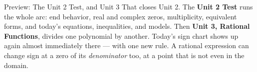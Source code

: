 \documentclass[10pt]{article}
\begin{document}
\vspace{0.1in}

\boxguard
\begin{notesbox}{Preview: The Unit 2 Test, and Unit 3}
That closes Unit 2. The \textbf{Unit 2 Test} runs the whole arc: end behavior,
real and complex zeros, multiplicity, equivalent forms, and today's equations,
inequalities, and models. Then \textbf{Unit 3, Rational Functions}, divides one
polynomial by another. Today's sign chart shows up again almost immediately
there --- with one new rule. A rational expression can change sign at a zero of
its \textit{denominator} too, at a point that is not even in the domain.
\end{notesbox}
\end{document}
